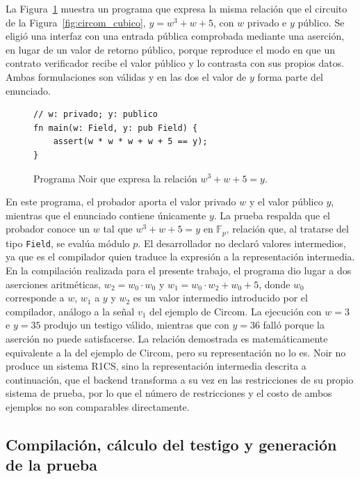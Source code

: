 La Figura~\ref{fig:noir_cubico} muestra un programa que expresa la misma relación que el
circuito de la Figura~\ref{fig:circom_cubico}, $y = w^{3} + w + 5$, con $w$ privado e $y$
público. Se eligió una interfaz con una entrada pública comprobada mediante una aserción, en lugar
de un valor de retorno público, porque reproduce el modo en que un contrato verificador recibe el
valor público y lo contrasta con sus propios datos. Ambas formulaciones son válidas y en las dos
el valor de $y$ forma parte del enunciado.

\begin{figure}[htbp]
	\centering
	\begin{minipage}{0.8\textwidth}
		\begin{lstlisting}[language=Noir]
// w: privado; y: publico
fn main(w: Field, y: pub Field) {
    assert(w * w * w + w + 5 == y);
}
\end{lstlisting}
	\end{minipage}
	\caption{Programa Noir que expresa la relación $w^{3} + w + 5 = y$.}
	\label{fig:noir_cubico}
\end{figure}

En este programa, el probador aporta el valor privado $w$ y el valor público $y$, mientras que
el enunciado contiene únicamente $y$. La prueba respalda que el probador conoce un $w$ tal que
$w^{3} + w + 5 = y$ en $\mathbb{F}_p$, relación que, al tratarse del tipo \lstinline|Field|, se
evalúa módulo $p$. El desarrollador no declaró valores intermedios, ya que es el compilador quien
traduce la expresión a la representación intermedia. En la compilación realizada para el presente
trabajo, el programa dio lugar a dos aserciones aritméticas, $w_2 = w_0 \cdot w_0$ y
$w_1 = w_0 \cdot w_2 + w_0 + 5$, donde $w_0$ corresponde a $w$, $w_1$ a $y$ y $w_2$ es un valor
intermedio introducido por el compilador, análogo a la señal $v_1$ del ejemplo de Circom. La
ejecución con $w = 3$ e $y = 35$ produjo un testigo válido, mientras que con $y = 36$ falló porque
la aserción no puede satisfacerse. La relación demostrada es matemáticamente equivalente a la del
ejemplo de Circom, pero su representación no lo es. Noir no produce un sistema R1CS, sino la
representación intermedia descrita a continuación, que el backend transforma a su vez en las
restricciones de su propio sistema de prueba, por lo que el número de restricciones y el costo de
ambos ejemplos no son comparables directamente.

\subsection{Compilación, cálculo del testigo y generación de la prueba}
\label{sec:noir_flujo}

